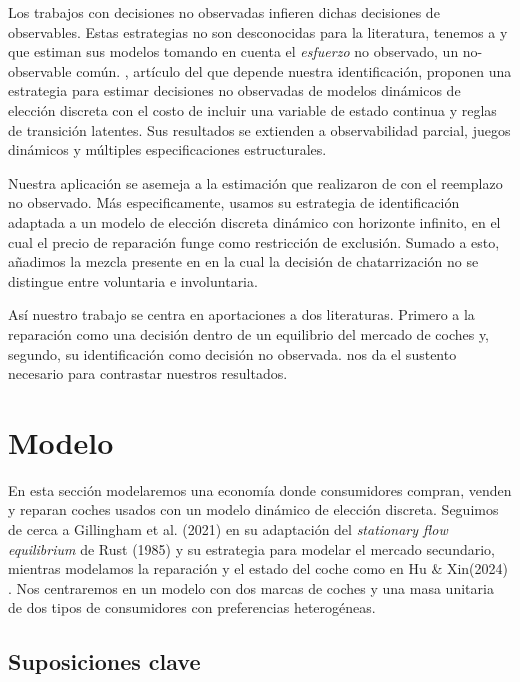 \documentclass{article}
\begin{document}
Los trabajos con decisiones no observadas infieren dichas decisiones de observables. Estas estrategias no son desconocidas para la literatura, tenemos a \textcite{MisraNair2011} y \textcite{GayleMiller2015} que estiman sus modelos tomando en cuenta el \textit{esfuerzo} no observado, un no-observable común. \textcite{HuXin2024}, artículo del que depende nuestra identificación, proponen una estrategia para estimar decisiones no observadas de modelos dinámicos de elección discreta con el costo de incluir una variable de estado continua y reglas de transición latentes. Sus resultados se extienden a observabilidad parcial, juegos dinámicos y múltiples especificaciones estructurales.

Nuestra aplicación se asemeja a la estimación que realizaron de \textcite{Rust1987} con el reemplazo no observado. Más especificamente, usamos su estrategia de identificación adaptada a un modelo de elección discreta dinámico con horizonte infinito, en el cual el precio de reparación funge como restricción de exclusión. Sumado a esto, añadimos la mezcla presente en \textcite{Gillingham2022} en la cual la decisión de chatarrización no se distingue entre voluntaria e involuntaria.

Así nuestro trabajo se centra en aportaciones a dos literaturas. Primero a la reparación como una decisión dentro de un equilibrio del mercado de coches y, segundo, su identificación como decisión no observada. \textcite{Gillingham2022} nos da el sustento necesario para contrastar nuestros resultados.



\section{Modelo}


En esta sección modelaremos una economía donde consumidores compran, venden y reparan coches usados con un modelo dinámico de elección discreta. Seguimos de cerca a Gillingham et al. (2021) en su adaptación del \textit{stationary flow equilibrium} de Rust (1985) y su estrategia para modelar el mercado secundario, mientras modelamos la reparación y el estado del coche como en Hu \& Xin(2024) . Nos centraremos en un modelo con dos marcas de coches y una masa unitaria de dos tipos de consumidores con preferencias heterogéneas. 



\subsection{Suposiciones clave}
\end{document}
